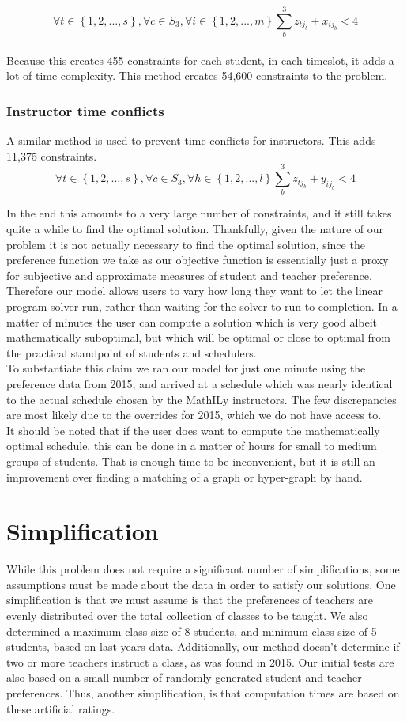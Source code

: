 \documentclass[11pt]{article}
\begin{document}
\[\forall t \in \left\{ {1,2,...,s}\right\},\forall c \in S_3, \forall i \in \left\{ {1,2,...,m}\right\} \sum_{b}^{3}z_{tj_b}+x_{ij_b} < 4\]
\\Because this creates 455 constraints for each student, in each timeslot, it adds a lot of time complexity. This method creates 54,600 constraints to the problem.
\subsubsection{Instructor time conflicts}
A similar method is used to prevent time conflicts for instructors. This adds 11,375 constraints.
\[\forall t \in \left\{ {1,2,...,s}\right\},\forall c \in S_3, \forall h \in \left\{ {1,2,...,l}\right\} \sum_{b}^{3}z_{tj_b}+y_{ij_b} < 4\]

\indent In the end this amounts to a very large number of constraints, and it still takes quite a while to find the optimal solution. Thankfully, given the nature of our problem it is not actually necessary to find the optimal solution, since the preference function we take as our objective function is essentially just a proxy for subjective and approximate measures of student and teacher preference. Therefore our model allows users to vary how long they want to let the linear program solver run, rather than waiting for the solver to run to completion. In a matter of minutes the user can compute a solution which is very good albeit mathematically suboptimal, but which will be optimal or close to optimal from the practical standpoint of students and schedulers.\\
\indent To substantiate this claim we ran our model for just one minute using the preference data from 2015, and arrived at a schedule which was nearly identical to the actual schedule chosen by the MathILy instructors. The few discrepancies are most likely due to the overrides for 2015, which we do not have access to.\\
\indent It should be noted that if the user does want to compute the mathematically optimal schedule, this can be done in a matter of hours for small to medium groups of students.  That is enough time to be inconvenient, but it is still an improvement over finding a matching of a graph or hyper-graph by hand.

\section{Simplification}
While this problem does not require a significant number of simplifications, some assumptions must be made about the data in order to satisfy our solutions. One simplification is that we must assume is that the preferences of teachers are evenly distributed over the total collection of classes to be taught. We also determined a maximum class size of 8 students, and minimum class size of 5 students, based on last years data. Additionally, our method doesn't determine if two or more teachers instruct a class, as was found in 2015. Our initial tests are also based on a small number of randomly generated student and teacher preferences. Thus, another simplification, is that computation times are based on these artificial ratings. \\
\end{document}
